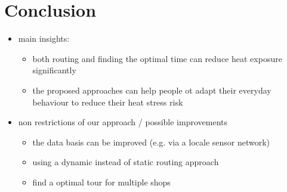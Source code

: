 
\section{Conclusion}

\begin{itemize}
	\item main insights:
		\begin{itemize}
			\item both routing and finding the optimal time can reduce heat exposure significantly
			\item the proposed approaches can help people ot adapt their everyday behaviour  to reduce their heat stress risk
		\end{itemize}
	\item non restrictions of our approach / possible improvements
		\begin{itemize}
			\item the data basis can be improved (e.g. via a locale sensor network)
			\item using a dynamic instead of static routing approach
			\item find a optimal tour for multiple shops 
		\end{itemize}
\end{itemize}
